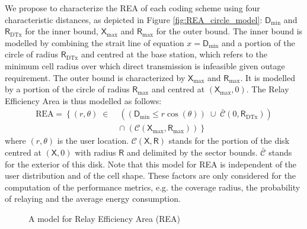 \documentclass[journal]{IEEEtran}
\theoremstyle{definition}
\begin{document}
We propose to characterize the REA of each coding scheme using four characteristic distances, as depicted in Figure \ref{fig:REA_circle_model}: $\mathsf{D}_{\min}$ and $\mathsf{R}_{\text{DTx}}$ for the inner bound, $\mathsf{X}_{\max}$ and $\mathsf{R}_{\max}$ for the outer bound. The inner bound is modelled by combining the strait line of equation  $x=\mathsf{D}_{\min}$ and a portion of the circle of radius $\mathsf{R}_{\text{DTx}}$ and centred at the base station, which refers to the minimum cell radius over which direct transmission is infeasible given outage requirement. The outer bound is characterized by $\mathsf{X}_{\max}$ and $\mathsf{R}_{\max}$. It is modelled by a portion of the circle of radius $\mathsf{R}_{\max}$ and centred at $(\mathsf{X}_{\max},0)$. The Relay Efficiency Area is thus modelled as follows:
\begin{equation}
\begin{split}
\text{REA} =  \left\{ (r, \theta) \; \in \; \right. &
\left( 
\left( \mathsf{D}_{\min} \leq  r \cos (\theta) \right) \; \cup \;
\mathcal{\bar{C}}\left(0, \mathsf{R}_{\text{DTx}}\right)
\right)
 \\  & \left.
\cap \; \left( \mathcal{C}\left(\mathsf{X}_{\max}, \mathsf{R}_{\max}\right) \right) \right \rbrace
\end{split}
\label{Eq:REA}
\end{equation}
where $(r, \theta)$ is the user location. $\mathcal{C}\left( \mathsf{X}, \mathsf{R}\right)$ stands for the portion of the disk centred at $\left(\mathsf{X}, 0\right)$ with radius $\mathsf{R}$ and delimited by the sector bounds.
$\mathcal{\bar{C}}$ stands for the exterior of this disk. Note that this model for REA is independent of the user distribution and of the cell shape. These factors are only considered for the computation of the performance metrics, e.g. the coverage radius, the probability of relaying and the average energy consumption.


\begin{figure}
	{\centering
	 \caption{A model for Relay Efficiency Area (REA)}  
	\label{fig:REA_model}
	}
\end{figure}
\end{document}
